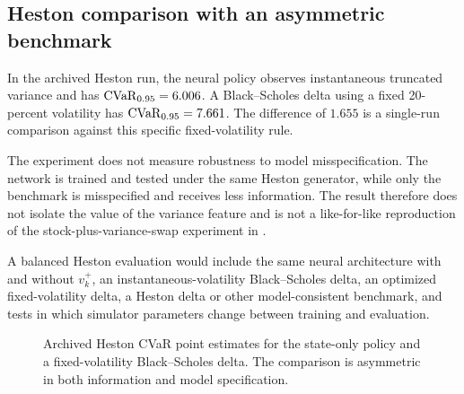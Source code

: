 \subsection{Heston comparison with an asymmetric benchmark}

In the archived Heston run, the neural policy observes instantaneous truncated
variance and has $\operatorname{CVaR}_{0.95}=6.006$. A Black--Scholes delta using a fixed
20-percent volatility has $\operatorname{CVaR}_{0.95}=7.661$. The difference of $1.655$ is a
single-run comparison against this specific fixed-volatility rule.

The experiment does not measure robustness to model misspecification. The
network is trained and tested under the same Heston generator, while only the
benchmark is misspecified and receives less information. The result therefore
does not isolate the value of the variance feature and is not a like-for-like
reproduction of the stock-plus-variance-swap experiment in
\citet{buehler2019}.

A balanced Heston evaluation would include the same neural architecture with
and without $v_k^+$, an instantaneous-volatility Black--Scholes delta, an
optimized fixed-volatility delta, a Heston delta or other model-consistent
benchmark, and tests in which simulator parameters change between training and
evaluation.

\begin{figure}[htbp]
\centering
{}
\caption{Archived Heston CVaR point estimates for the state-only policy and a
fixed-volatility Black--Scholes delta. The comparison is asymmetric in both
information and model specification.}
\label{fig:heston}
\end{figure}

